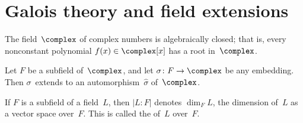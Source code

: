 \section{Galois theory and field extensions}

\begin{thm}
 The field~$\complex$ of complex numbers is algebraically
closed; that is, every nonconstant polynomial $f(x) \in
\complex[x]$ has a root in~$\complex$.
 \end{thm}

%

%
%

\begin{prop}
 Let $F$ be a subfield of~$\complex$, and let $\sigma \colon
F \to \complex$ be any embedding. Then $\sigma$~extends to an
automorphism~$\widehat\sigma$ of~$\complex$.
 \end{prop}

\begin{notation}
 If $F$ is a subfield of a field~$L$, then 
 	$|L:F|$
denotes
$\dim_F L$, the dimension of~$L$ as a vector space over~$F$. This is called the  of~$L$ over~$F$.
 \end{notation}

